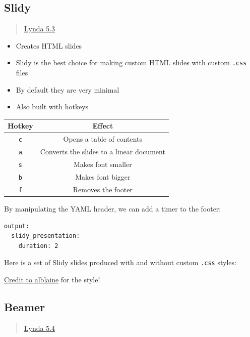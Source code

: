 \documentclass[]{article}
\providecommand{\tightlist}{%
  \setlength{\itemsep}{0pt}\setlength{\parskip}{0pt}}
\begin{document}
\hypertarget{slidy}{%
\subsection{Slidy}\label{slidy}}

\begin{quote}
\href{https://www.lynda.com/RStudio-tutorials/Features-Slidy-presentations/699348/2700141-4.html?srchtrk=index\%3a1\%0alinktypeid\%3a2\%0aq\%3ar+markdown\%0apage\%3a1\%0as\%3arelevance\%0asa\%3atrue\%0aproducttypeid\%3a2}{Lynda
5.3}
\end{quote}

\begin{itemize}
\tightlist
\item
  Creates HTML slides
\item
  Slidy is the best choice for making custom HTML slides with custom
  \texttt{.css} files
\item
  By default they are very minimal
\item
  Also built with hotkeys
\end{itemize}

\begin{longtable}[]{@{}cc@{}}
\toprule
Hotkey & Effect\tabularnewline
\midrule
\endhead
\texttt{c} & Opens a table of contents\tabularnewline
\texttt{a} & Converts the slides to a linear document\tabularnewline
\texttt{s} & Makes font smaller\tabularnewline
\texttt{b} & Makes font bigger\tabularnewline
\texttt{f} & Removes the footer\tabularnewline
\bottomrule
\end{longtable}

By manipulating the YAML header, we can add a timer to the footer:

\begin{verbatim}
output:
  slidy_presentation:
    duration: 2
\end{verbatim}

Here is a set of Slidy slides produced with and without custom
\texttt{.css} styles:

\href{https://github.com/alblaine/countess/blob/master/styles.css}{Credit
to alblaine} for the style!

\hypertarget{beamer}{%
\subsection{Beamer}\label{beamer}}

\begin{quote}
\href{https://www.lynda.com/RStudio-tutorials/PDF-presentations-Beamer/699348/2801134-4.html?srchtrk=index\%3a1\%0alinktypeid\%3a2\%0aq\%3ar+markdown\%0apage\%3a1\%0as\%3arelevance\%0asa\%3atrue\%0aproducttypeid\%3a2}{Lynda
5.4}
\end{quote}
\end{document}
